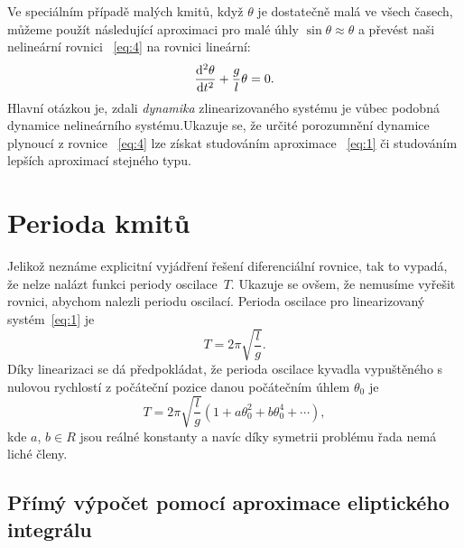 \documentclass[reqno, a4paper]{amsart}
\begin{document}
		Ve speciálním případě malých kmitů, když $\theta$ je dostatečně malá ve všech časech, můžeme použít následující aproximaci pro malé úhly $\sin \theta \approx \theta$ a převést naši nelineární rovnici ~\eqref{eq:4} na rovnici lineární:
		\begin{equation}
			\label{eq:1}
			\frac{\mathrm{d}^2 {\theta}}{\mathrm{d} {t}^2} + \frac{g}{l} \theta = 0.
		\end{equation}
		Hlavní otázkou je, zdali \emph{dynamika} zlinearizovaného systému je vůbec podobná dynamice nelineárního systému.Ukazuje se, že určité porozumnění dynamice plynoucí z rovnice ~\eqref{eq:4} lze získat studováním aproximace ~\eqref{eq:1} či studováním lepších aproximací stejného typu.
		
		\section{Perioda kmitů}
		\label{sec:Perioda kmitů}
		Jelikož neznáme explicitní vyjádření řešení diferenciální rovnice, tak to vypadá, že nelze nalázt funkci periody oscilace~$T$. Ukazuje se ovšem, že nemusíme vyřešit rovnici, abychom nalezli periodu oscilací. Perioda oscilace pro linearizovaný systém~\eqref{eq:1} je
		\begin{equation}
			\label{eq:2}
			T
			=
			2\pi
			\sqrt{
				\frac{l}{g}
			}
			.
		\end{equation}
		Díky linearizaci se dá předpokládat, že perioda oscilace kyvadla vypuštěného s nulovou rychlostí z počáteční pozice danou počátečním úhlem $\theta_{0}$ je 
		\begin{equation}
			\label{eq:3}
			T
			=
			2\pi
			\sqrt{
				\frac{l}{g}
			}
			\left(
			1
			+
			a \theta_{0}^2
			+
			b \theta_{0}^4
			+
			\cdots
			\right)
			,
		\end{equation}
		kde $a$, $b \in R$ jsou reálné konstanty a navíc díky symetrii problému řada nemá liché členy.
		
		\subsection{Přímý výpočet pomocí aproximace eliptického integrálu}
		\label{Přímý výpočet pomocí aproximace eliptického integrálu}
		
\end{document}
